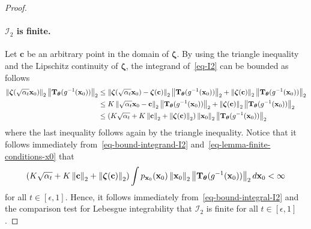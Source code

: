 \begin{proof}
\paragraph{$\mathcal{I}_{2}$ is finite.}
Let $\mathbf{c}$ be an arbitrary point in the domain of $\boldsymbol{\zeta}$. By using the triangle inequality and the Lipschitz continuity of $\boldsymbol{\zeta}$, the integrand of~\eqref{eq-I2} can be bounded as follows
\begin{equation}
\label{eq-bound-integrand-I2}
\begin{aligned}
\left\lVert \boldsymbol{\zeta}(\sqrt{\alpha_t}\mathbf{x}_0) \right\rVert_2\left\lVert \mathbf{T}_{\boldsymbol{\theta}}(g^{-1}(\mathbf{x}_0)) \right\rVert_2 
&\leq \left\lVert \boldsymbol{\zeta}(\sqrt{\alpha_t}\mathbf{x}_0)-\boldsymbol{\zeta}(\mathbf{c}) \right\rVert_2\left\lVert \mathbf{T}_{\boldsymbol{\theta}}(g^{-1}(\mathbf{x}_0)) \right\rVert_2  + \left\lVert \boldsymbol{\zeta}(\mathbf{c}) \right\rVert_2\left\lVert \mathbf{T}_{\boldsymbol{\theta}}(g^{-1}(\mathbf{x}_0)) \right\rVert_2 \\ 
&\leq   K\left\lVert \sqrt{\alpha_t}\mathbf{x}_0-\mathbf{c} \right\rVert_2\left\lVert \mathbf{T}_{\boldsymbol{\theta}}(g^{-1}(\mathbf{x}_0)) \right\rVert_2  +  \left\lVert \boldsymbol{\zeta}(\mathbf{c}) \right\rVert_2\left\lVert \mathbf{T}_{\boldsymbol{\theta}}(g^{-1}(\mathbf{x}_0)) \right\rVert_2 \\ 
&\leq (K\sqrt{\alpha_t} +K\left\lVert \mathbf{c} \right\rVert_2 +\left\lVert \boldsymbol{\zeta}(\mathbf{c}) \right\rVert_2)\left\lVert \mathbf{x}_0 \right\rVert_2\left\lVert \mathbf{T}_{\boldsymbol{\theta}}(g^{-1}(\mathbf{x}_0)) \right\rVert_2  
\end{aligned}
\end{equation}
where the last inequality follows again by the triangle inequality. Notice that it follows immediately from~\eqref{eq-bound-integrand-I2} and~\eqref{eq-lemma-finite-conditions-x0} that
\begin{equation}
\label{eq-bound-integral-I2}
(K\sqrt{\alpha_t} +K\left\lVert \mathbf{c} \right\rVert_2 +\left\lVert \boldsymbol{\zeta}(\mathbf{c}) \right\rVert_2)\int p_{\mathbf{x}_{0}}(\mathbf{x}_{0})\left\lVert \mathbf{x}_0 \right\rVert_2\left\lVert \mathbf{T}_{\boldsymbol{\theta}}(g^{-1}(\mathbf{x}_0)) \right\rVert_2 d\mathbf{x}_{0} < \infty
\end{equation}
for all $t\in[\epsilon,1]$. Hence, it follows immediately from~\eqref{eq-bound-integral-I2} and the comparison test for Lebesgue integrability that $\mathcal{I}_{2}$ is finite for all $t\in[\epsilon,1]$.

\end{proof}
